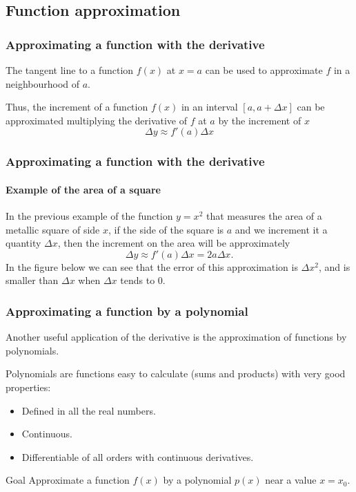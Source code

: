 \subsection{Function approximation}

\begin{frame}
\frametitle{Approximating a function with the derivative}
The tangent line to a function $f(x)$ at $x=a$ can be used to approximate $f$ in a neighbourhood of $a$.
\begin{center}

\end{center}
Thus, the increment of a function $f(x)$ in an interval $[a,a+\Delta x]$ can be approximated multiplying the derivative of $f$ at $a$ by the increment of $x$
\[
\Delta y \approx f'(a)\Delta x
\]
\end{frame}


\begin{frame}
\frametitle{Approximating a function with the derivative}
\framesubtitle{Example of the area of a square}
In the previous example of the function $y=x^2$ that measures the area of a metallic square of side $x$, if the side of the square is $a$ and we increment it a quantity $\Delta x$, then the increment on the area will be approximately
\[
\Delta y \approx f'(a)\Delta x = 2a\Delta x.
\]
In the figure below we can see that the error of this approximation is $\Delta x^2$, and is smaller than $\Delta x$ when $\Delta x$ tends to 0. 
\begin{center}
\end{center}
\end{frame}


\begin{frame}
\frametitle{Approximating a function by a polynomial}
Another useful application of the derivative is the approximation of functions by polynomials.

Polynomials are functions easy to calculate (sums and products) with very good properties:
\begin{itemize}
\item Defined in all the real numbers.
\item Continuous.
\item Differentiable of all orders with continuous derivatives.
\end{itemize}

\begin{block}{Goal}
Approximate a function $f(x)$ by a polynomial $p(x)$ near a value $x=x_0$.
\end{block}
\end{frame}



